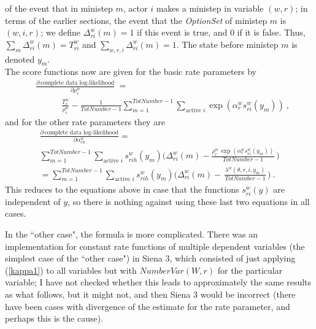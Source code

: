 \documentclass[a4paper,12pt,fleqn]{article}
\begin{document}
of the event that in ministep $m$, actor $i$ makes a ministep
in variable $(w,r)$; in terms of the earlier sections,
the event that the \textit{OptionSet} of ministep $m$ is $(w,i,r)$;
we define $\Delta^w_{ri}(m) = 1$  if this event is true,
and 0 if it is false.
Thus, $\sum_m \Delta^w_{ri}(m) = T^w_{ri}$ and
$\sum_{w,r,i} \Delta^w_{ri}(m) = 1$.
The state before ministep $m$ is denoted $y_m$.
\medskip
\\
\hspace*{\parindent}
The score functions now are given for the basic rate parameters by
\begin{equation}
\begin{split}
& \frac{\partial\, \text{complete data log-likelihood}}{\partial \rho^w_r} \ =\\
& \hspace{3em}    \frac{T^w_r}{\rho^w_r} -
   \frac{1}{\textit{TotNumber}-1} \sum_{m=1}^{\textit{TotNumber}-1}
     \sum_{\text{active } i}
        \exp(\alpha^w_{r} s^w_{ri}(y_m)) \  , \label{tscore5}
\end{split}
\end{equation}
and for the other rate parameters they are
\begin{multline}
  \frac{\partial \, \text{complete data log-likelihood}}{\partial \alpha^w_{rh}}
  = \\
    \sum_{m=1}^{\textit{TotNumber}-1}
     \sum_{\text{active } i}
       s^w_{rih}(y_m) \Bigg(\Delta^w_{ri}(m) -
      \frac{ \rho^w_r \, \exp(\alpha^w_{r} s^w_{ri}(y_m) )}{\textit{TotNumber}-1} \,  \Bigg)
       \\
   =    \sum_{m=1}^{\textit{TotNumber}-1}
     \sum_{\text{active } i}
     s^w_{rih}(y_m) \Bigg( \Delta^w_{ri}(m) - \,
    \frac{\lambda^w(\theta, r,i, y_m)}{\textit{TotNumber}-1} \,  \Bigg) \ . \label{tscore6}
\iffalse
    =   \\
    \Bigg(  \sum_{m=1}^{\textit{TotNumber}-1}
     \sum_{\text{active } i}
     s^w_{rih}(y_m) \, \Delta^w_{ri}(m) \Bigg) -
      \Bigg(  \frac{1}{\textit{TotNumber}-1}  \sum_{m=1}^{\textit{TotNumber}-1}
     \sum_{\text{active } i}
           s^w_{rih}(y_m) \,  \lambda^w(\theta, r,i, y_m) \,  \Bigg)
               \ .
\fi
\end{multline}
This reduces to the equations above in case that the functions
$s^w_{ri}(y)$ are independent of $y$, so there is nothing against
using these last two equations in all cases.


\iffalse
In the ``other case", the formula is more complicated.
There was an implementation for constant rate functions of multiple dependent
variables (the simplest case of the ``other case")
in Siena 3, which consisted of just applying (\ref{kappa1}) to all variables
but with $\textit{NumberVar}(W,r)$ for the particular variable;
I have not checked whether this leads to approximately the same results as what
follows, but it might not, and then Siena 3 would be incorrect
(there have been cases with divergence of the estimate for the rate parameter,
and perhaps this is the cause).
\end{document}
